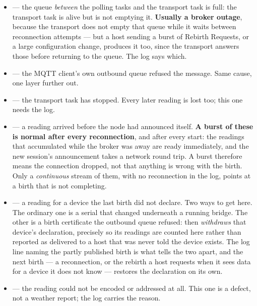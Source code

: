 \begin{itemize}
  \item {} --- the queue \emph{between} the polling tasks and the transport
        task is full: the transport task is alive but is not emptying it. \textbf{Usually a
        broker outage}, because the transport does not empty that queue while it waits between
        reconnection attempts --- but a host sending a burst of Rebirth Requests, or a large
        configuration change, produces it too, since the transport answers those before
        returning to the queue. The log says which.
  \item {} --- the MQTT client's own outbound queue refused the
        message. Same cause, one layer further out.
  \item {} --- the transport task has stopped. Every later reading is lost
        too; this one needs the log.
  \item {} --- a reading arrived before the node had announced itself.
        \textbf{A burst of these is normal after every reconnection}, and after every start:
        the readings that accumulated while the broker was away are ready immediately, and the
        new session's announcement takes a network round trip. A burst therefore means the
        connection dropped, not that anything is wrong with the birth. Only a \emph{continuous}
        stream of them, with no reconnection in the log, points at a birth that is not
        completing.
  \item {} --- a reading for a device the last birth did not declare.
        Two ways to get here. The ordinary one is a serial that changed underneath a running
        bridge. The other is a birth certificate the outbound queue refused: \prog then
        \emph{withdraws} that device's declaration, precisely so its readings are counted here
        rather than reported as delivered to a host that was never told the device exists. The
        log line naming the partly published birth is what tells the two apart, and the next
        birth --- a reconnection, or the rebirth a host requests when it sees data for a device
        it does not know --- restores the declaration on its own.
  \item {} --- the reading could not be encoded or addressed at all. This
        one is a defect, not a weather report; the log carries the reason.
\end{itemize}

